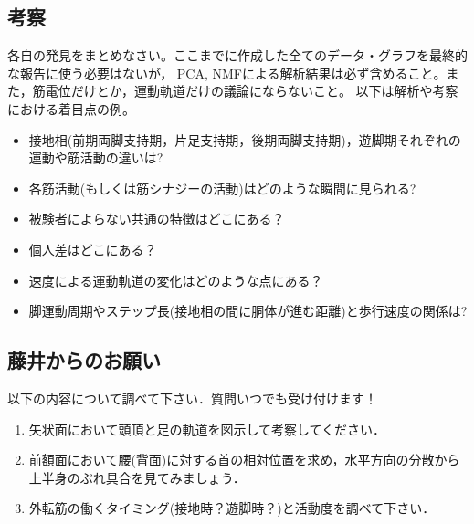 \documentclass{jarticle}
\begin{document}
\subsection{考察}
各自の発見をまとめなさい。ここまでに作成した全てのデータ・グラフを最終的な報告に使う必要はないが，
PCA, NMFによる解析結果は必ず含めること。また，筋電位だけとか，運動軌道だけの議論にならないこと。
以下は解析や考察における着目点の例。

\begin{itemize}
\item 接地相(前期両脚支持期，片足支持期，後期両脚支持期)，遊脚期それぞれの運動や筋活動の違いは?
\item 各筋活動(もしくは筋シナジーの活動)はどのような瞬間に見られる?
\item 被験者によらない共通の特徴はどこにある？
\item 個人差はどこにある？
\item 速度による運動軌道の変化はどのような点にある？
\item 脚運動周期やステップ長(接地相の間に胴体が進む距離)と歩行速度の関係は?
\end{itemize}



\subsection{藤井からのお願い}
以下の内容について調べて下さい．質問いつでも受け付けます！
\begin{enumerate}
\item 矢状面において頭頂と足の軌道を図示して考察してください．
\item 前額面において腰(背面)に対する首の相対位置を求め，水平方向の分散から上半身のぶれ具合を見てみましょう．
\item 外転筋の働くタイミング(接地時？遊脚時？)と活動度を調べて下さい．
\end{enumerate}
\end{document}
